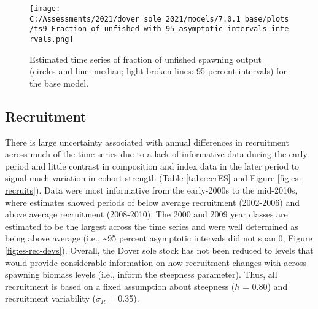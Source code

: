 \documentclass[11pt,
  english,
  a4paper,
]{article}
\begin{document}
\tagmcend\tagstructend


\begin{figure}
\centering
\texttt{[image: C:/Assessments/2021/dover\_sole\_2021/models/7.0.1\_base/plots/ts9\_Fraction\_of\_unfished\_with\_95\_asymptotic\_intervals\_intervals.png]}
\caption{Estimated time series of fraction of unfished spawning output (circles and line: median; light broken lines: 95 percent intervals) for the base model.\label{fig:es-depl}}
\end{figure}

\tagmcend\tagstructend

\clearpage


\hypertarget{recruitment}{%
\subsection*{Recruitment}\label{recruitment}}

\leavevmode\tagmcend\tagstructend


There is large uncertainty associated with annual differences in recruitment across much of the time series due to a lack of informative data during the early period and little contrast in composition and index data in the later period to signal much variation in cohort strength (Table \ref{tab:recrES} and Figure \ref{fig:es-recruits}). Data were most informative from the early-2000s to the mid-2010s, where estimates showed periods of below average recruitment (2002-2006) and above average recruitment (2008-2010). The 2000 and 2009 year classes are estimated to be the largest across the time series and were well determined as being above average (i.e., \textasciitilde95 percent asymptotic intervals did not span 0, Figure \ref{fig:es-rec-devs}). Overall, the Dover sole stock has not been reduced to levels that would provide considerable information on how recruitment changes with across spawning biomass levels (i.e., inform the steepness parameter). Thus, all recruitment is based on a fixed assumption about steepness ({\(h\)\leavevmode\tagmcend\tagstructend} = 0.80) and recruitment variability ({\(\sigma_R\)\leavevmode\tagmcend\tagstructend} = 0.35).
\end{document}
